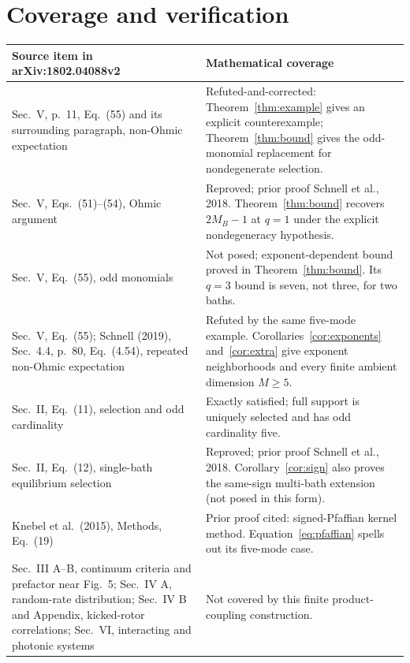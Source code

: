 \documentclass[11pt]{article}
\begin{document}
\section{Coverage and verification}
{\small
\begin{longtable}{@{}p{.43\linewidth}p{.50\linewidth}@{}}
\toprule
Source item in arXiv:1802.04088v2 & Mathematical coverage\\
\midrule
Sec.\ V, p.\ 11, Eq.\ (55) and its surrounding paragraph,
non-Ohmic expectation
& Refuted-and-corrected: Theorem~\ref{thm:example} gives an
explicit counterexample; Theorem~\ref{thm:bound} gives the
odd-monomial replacement for nondegenerate selection.\\[4pt]
Sec.\ V, Eqs.\ (51)--(54), Ohmic argument
& Reproved; prior proof Schnell et al., 2018. Theorem~\ref{thm:bound}
recovers $2M_B-1$ at $q=1$ under the explicit nondegeneracy
hypothesis.\\[4pt]
Sec.\ V, Eq.\ (55), odd monomials
& Not posed; exponent-dependent bound proved in
Theorem~\ref{thm:bound}. Its $q=3$ bound is seven, not three,
for two baths.\\[4pt]
Sec.\ V, Eq.\ (55); Schnell (2019), Sec.\ 4.4, p.\ 80,
Eq.\ (4.54), repeated non-Ohmic expectation
& Refuted by the same five-mode example. Corollaries~\ref{cor:exponents}
and~\ref{cor:extra} give exponent neighborhoods and every
finite ambient dimension $M\geq5$.\\[4pt]
Sec.\ II, Eq.\ (11), selection and odd cardinality
& Exactly satisfied; full support is uniquely selected and has
  odd cardinality five.\\[4pt]
Sec.\ II, Eq.\ (12), single-bath equilibrium selection
& Reproved; prior proof Schnell et al., 2018.
Corollary~\ref{cor:sign} also proves the same-sign multi-bath
extension (not posed in this form).\\[4pt]
Knebel et al.\ (2015), Methods, Eq.\ (19)
& Prior proof cited: signed-Pfaffian kernel method.
Equation~\eqref{eq:pfaffian} spells out its five-mode case.\\[4pt]
Sec.\ III A--B, continuum criteria and prefactor near Fig.\ 5;
Sec.\ IV A, random-rate distribution; Sec.\ IV B and Appendix,
kicked-rotor correlations; Sec.\ VI, interacting and photonic systems
& Not covered by this finite product-coupling construction.\\
\bottomrule
\end{longtable}}
\end{document}
